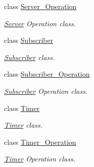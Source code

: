 \begin{DoxyCompactItemize}
class \hyperlink{classzcm_1_1Server__Operation}{Server\+\_\+\+Operation}
\begin{DoxyCompactList}\small\item\em \hyperlink{classzcm_1_1Server}{Server} Operation class. \end{DoxyCompactList}\item 
class \hyperlink{classzcm_1_1Subscriber}{Subscriber}
\begin{DoxyCompactList}\small\item\em \hyperlink{classzcm_1_1Subscriber}{Subscriber} class. \end{DoxyCompactList}\item 
class \hyperlink{classzcm_1_1Subscriber__Operation}{Subscriber\+\_\+\+Operation}
\begin{DoxyCompactList}\small\item\em \hyperlink{classzcm_1_1Subscriber}{Subscriber} Operation class. \end{DoxyCompactList}\item 
class \hyperlink{classzcm_1_1Timer}{Timer}
\begin{DoxyCompactList}\small\item\em \hyperlink{classzcm_1_1Timer}{Timer} class. \end{DoxyCompactList}\item 
class \hyperlink{classzcm_1_1Timer__Operation}{Timer\+\_\+\+Operation}
\begin{DoxyCompactList}\small\item\em \hyperlink{classzcm_1_1Timer}{Timer} Operation class. \end{DoxyCompactList}\end{DoxyCompactItemize}

